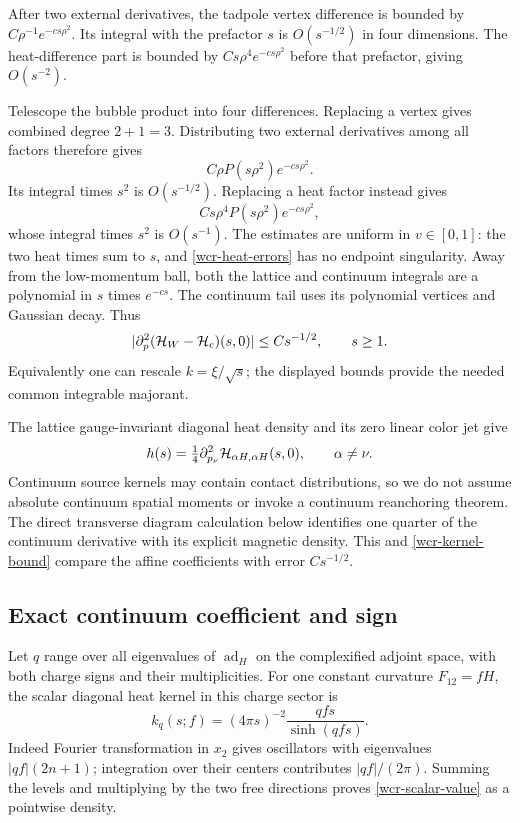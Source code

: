 \documentclass[11pt]{article}
\theoremstyle{remark}
\begin{document}
After two external derivatives, the tadpole vertex difference is bounded
by \(C\rho^{-1}e^{-cs\rho^2}\). Its integral with the prefactor \(s\)
is \(O(s^{-1/2})\) in four dimensions.
The heat-difference part is bounded by \(Cs\rho^4e^{-cs\rho^2}\)
before that prefactor, giving \(O(s^{-2})\).

Telescope the bubble product into four differences.
Replacing a vertex gives combined degree \(2+1=3\). Distributing
two external derivatives among all factors therefore gives
\[
 C\rho P(s\rho^2)e^{-cs\rho^2}.
\]
Its integral times \(s^2\) is \(O(s^{-1/2})\).
Replacing a heat factor instead gives
\[
 Cs\rho^4P(s\rho^2)e^{-cs\rho^2},
\]
whose integral times \(s^2\) is \(O(s^{-1})\).
The estimates are uniform in \(v\in[0,1]\): the two heat times sum to
\(s\), and \eqref{wcr-heat-errors} has no endpoint singularity.
Away from the low-momentum ball, both the lattice and continuum
integrals are a polynomial in \(s\) times \(e^{-cs}\).
The continuum tail uses its polynomial vertices and Gaussian decay.
Thus
\begin{equation}
 |\partial_p^2({\cal H}_{W}-{\cal H}_{c})(s,0)|
       \le Cs^{-1/2},\qquad s\ge1.
 \label{wcr-kernel-bound}
\end{equation}
Equivalently one can rescale \(k=\xi/\sqrt{s}\);
the displayed bounds provide the needed common integrable majorant.

The lattice gauge-invariant diagonal heat density and its zero linear
color jet give
\begin{equation}
 h(s)=\tfrac14\partial_{p_\nu}^2
              {\cal H}_{\alpha H,\alpha H}(s,0),\qquad\alpha\ne\nu.
 \label{wcr-density-factor}
\end{equation}
Continuum source kernels may contain contact distributions, so we do
not assume absolute continuum spatial moments or invoke a continuum
reanchoring theorem. The direct transverse diagram calculation below
identifies one quarter of the continuum derivative with its explicit
magnetic density. This and \eqref{wcr-kernel-bound} compare the affine
coefficients with error \(Cs^{-1/2}\).

\subsection{Exact continuum coefficient and sign}
\label{wcr-value-section}

Let \(q\) range over all eigenvalues of \(\operatorname{ad}_H\) on the
complexified adjoint space, with both charge signs and their
multiplicities. For one constant curvature \(F_{12}=fH\), the scalar
diagonal heat kernel in this charge sector is
\begin{equation}
 k_q(s;f)=(4\pi s)^{-2}\frac{qfs}{\sinh(qfs)}.
 \label{wcr-scalar-value}
\end{equation}
Indeed Fourier transformation in \(x_2\) gives oscillators with
eigenvalues \(|qf|(2n+1)\); integration over their centers contributes
\(|qf|/(2\pi)\). Summing the levels and multiplying by the two free
directions proves \eqref{wcr-scalar-value} as a pointwise density.
\end{document}
